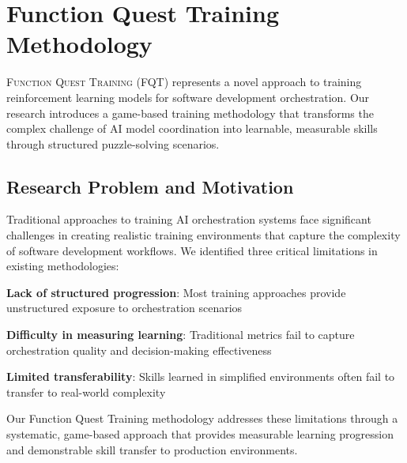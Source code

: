 
\section*{Function Quest Training Methodology}

\vspace{0.3cm}
\lettrine{F}{unction Quest Training} (FQT) represents a novel approach to training reinforcement learning models for software development orchestration. Our research introduces a game-based training methodology that transforms the complex challenge of AI model coordination into learnable, measurable skills through structured puzzle-solving scenarios.

\vspace{0.2cm}
\subsection*{Research Problem and Motivation}

Traditional approaches to training AI orchestration systems face significant challenges in creating realistic training environments that capture the complexity of software development workflows. We identified three critical limitations in existing methodologies:

\begin{compactlist}
    \item \textbf{Lack of structured progression}: Most training approaches provide unstructured exposure to orchestration scenarios
    \item \textbf{Difficulty in measuring learning}: Traditional metrics fail to capture orchestration quality and decision-making effectiveness
    \item \textbf{Limited transferability}: Skills learned in simplified environments often fail to transfer to real-world complexity
\end{compactlist}

Our Function Quest Training methodology addresses these limitations through a systematic, game-based approach that provides measurable learning progression and demonstrable skill transfer to production environments.

